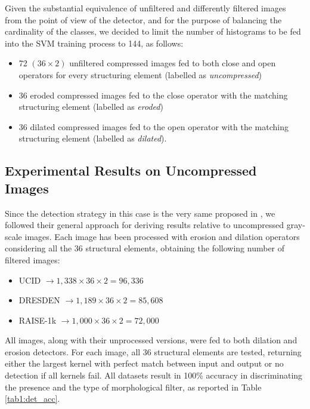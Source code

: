 \documentclass[review]{elsarticle}
\begin{document}
Given the substantial equivalence of unfiltered and differently filtered images from the point of view of the detector, and for the purpose of balancing the cardinality of the classes, we decided to limit the number of histograms to be fed into the SVM training process to 144, as follows:

\begin{itemize}
	\item 72 $(36 \times 2)$ unfiltered compressed images fed to both close and open operators for every structuring element (labelled as \textit{uncompressed})
	\item 36 eroded compressed images fed to the close operator with the matching structuring element (labelled as \textit{eroded})
	\item 36 dilated compressed images fed to the open operator with the matching structuring element (labelled as \textit{dilated}).
\end{itemize}


\subsection{Experimental Results on Uncompressed Images}

Since the detection strategy in this case is the very same proposed in \cite{de2017detecting}, we followed their general approach for deriving results relative to uncompressed gray-scale images. Each image has been processed with erosion and dilation operators considering all the 36 structural elements, obtaining the following number of filtered images:

\begin{itemize}
	\item UCID $\rightarrow 1,338\times 36 \times 2 = 96,336$
	\item DRESDEN $\rightarrow 1,189\times 36\times 2 = 85,608$
	\item RAISE-1k $\rightarrow 1,000\times 36\times 2 = 72,000$
\end{itemize}

All images, along with their unprocessed versions, were fed to both dilation and erosion detectors. For each image, all 36 structural elements are tested, returning either the largest kernel with perfect match between input and output or no detection if all kernels fail. All datasets result in 100\% accuracy in discriminating the presence and the type of morphological filter, as reported in Table \ref{tab1:det_acc}.
\end{document}
